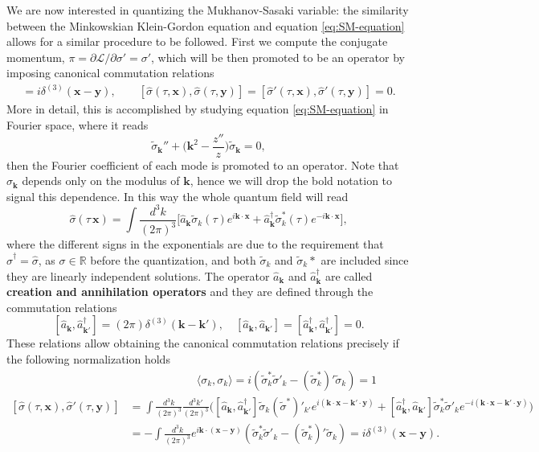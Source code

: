 We are now interested in quantizing the Mukhanov-Sasaki variable: the similarity between the Minkowskian Klein-Gordon equation and equation \eqref{eq:SM-equation} allows for a similar procedure to be followed. First we compute the conjugate momentum, $\pi= \partial\mathcal{L} /\partial \sigma'=\sigma'$, which will be then promoted to be an operator by imposing canonical commutation relations
\begin{align*}
    [\hat\sigma(\tau,\mathbf x),\hat\sigma'(\tau,\mathbf y)]=i\delta^{(3)}(\mathbf{x-y}),\qquad  [\hat\sigma(\tau,\mathbf x),\hat\sigma(\tau,\mathbf y)]= [\hat\sigma'(\tau,\mathbf x),\hat\sigma'(\tau,\mathbf y)]=0.
\end{align*}
More in detail, this is accomplished by studying equation \eqref{eq:SM-equation} in Fourier space, where it reads
$$\tilde\sigma_\mathbf{k}''+\bigg(\mathbf k^2-\frac{z''}{z}\bigg)\tilde\sigma_\mathbf{k}=0,$$
then the Fourier coefficient of each mode is promoted to an operator. Note that $\sigma_\mathbf{k}$ depends only on the modulus of $\mathbf k$, hence we will drop the bold notation to signal this dependence. In this way the whole quantum field will read
$$\hat\sigma(\tau\,\mathbf{x})=\int\frac{d^3k}{(2\pi)^3}\bigg[\hat a_{\mathbf k}\tilde\sigma_k(\tau)e^{i\mathbf{k\cdot x}} +\hat a_{\mathbf k}^{\dagger}\tilde\sigma^*_k(\tau)e^{-i\mathbf{k\cdot x}}\bigg],$$
where the different signs in the exponentials are due to the requirement that $\hat\sigma^\dagger=\hat\sigma$, as $\sigma\in\mathbb{R}$ before the quantization, and both $\tilde\sigma_k$ and $\tilde\sigma_k*$ are included since they are linearly independent solutions. The operator $\hat a_\mathbf{k}$ and $\hat a^\dagger_\mathbf{k}$ are called \textbf{creation and annihilation operators} and they are defined through the commutation relations $$[\hat a_\mathbf{k},\hat a^\dagger_\mathbf{k'}]=(2\pi)\delta^{(3)}(\mathbf{k-k'}),\quad [\hat a_\mathbf{k},\hat a_\mathbf{k'}]=[\hat a^\dagger_\mathbf{k},\hat a^\dagger_\mathbf{k'}]=0.$$ These relations allow obtaining the canonical commutation relations precisely if the following normalization holds
\begin{align*}
&\qquad\qquad\qquad\langle\sigma_k,\sigma_k\rangle=i(\tilde\sigma^*_k\tilde\sigma'_k-(\tilde\sigma_k^*)'\tilde\sigma_k)=1\\ [\hat\sigma(\tau,\mathbf x),\hat\sigma'(\tau,\mathbf y)]&=\int\frac{d^3k}{(2\pi)^3}\frac{d^3k'}{(2\pi)^3}    \Big([\hat a_\mathbf{k},\hat a^\dagger_\mathbf{k'}]\tilde\sigma_k(\tilde\sigma^*)'_{k'}e^{i(\mathbf{k\cdot x-k'\cdot y})}+[\hat a^\dagger_\mathbf{k},\hat a_\mathbf{k'}]\tilde\sigma_k^*\tilde\sigma'_ke^{-i(\mathbf{k\cdot x-k'\cdot y})}\Big)\\&=-\int\frac{d^3k}{(2\pi)^3}e^{i\mathbf{k\cdot(x-y)}}    (\tilde\sigma^*_k\tilde\sigma'_k-(\tilde\sigma_k^*)'\tilde\sigma_k)=i\delta^{(3)}(\mathbf{x-y}).
\end{align*}
